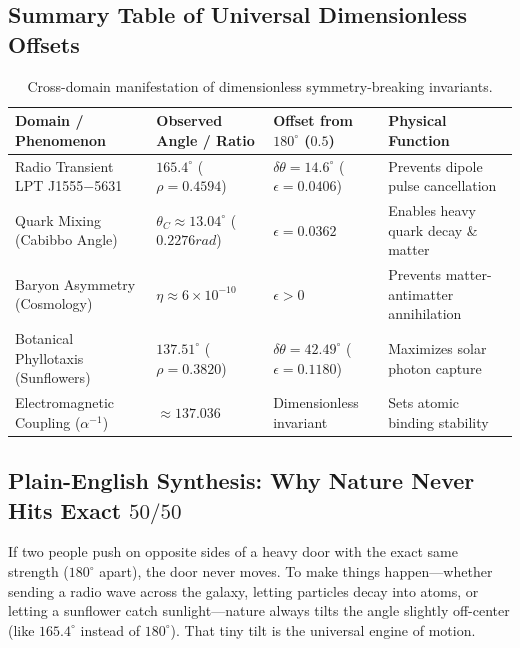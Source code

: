 \documentclass[11pt,a4paper,oneside]{article}
\def\text#1{#1}%
\def\texttt#1{#1}%
\theoremstyle{definition}
\begin{document}
\subsection{Summary Table of Universal Dimensionless Offsets}
\begin{table}[h]
\centering
\small
\begin{tabular}{@{} p{3.8cm} l l p{4.2cm} @{}}
\toprule
\textbf{Domain / Phenomenon} & \textbf{Observed Angle / Ratio} & \textbf{Offset from $180^\circ$ ($0.5$)} & \textbf{Physical Function} \\ \midrule
Radio Transient \texttt{LPT J1555$-$5631} & $165.4^\circ$ ($\rho = 0.4594$) & $\delta \theta = 14.6^\circ$ ($\epsilon = 0.0406$) & Prevents dipole pulse cancellation \\ \addlinespace[4pt]
Quark Mixing (Cabibbo Angle) & $\theta_C \approx 13.04^\circ$ ($0.2276\text{ rad}$) & $\epsilon = 0.0362$ & Enables heavy quark decay \& matter \\ \addlinespace[4pt]
Baryon Asymmetry (Cosmology) & $\eta \approx 6 \times 10^{-10}$ & $\epsilon > 0$ & Prevents matter-antimatter annihilation \\ \addlinespace[4pt]
Botanical Phyllotaxis (Sunflowers) & $137.51^\circ$ ($\rho = 0.3820$) & $\delta \theta = 42.49^\circ$ ($\epsilon = 0.1180$) & Maximizes solar photon capture \\ \addlinespace[4pt]
Electromagnetic Coupling ($\alpha^{-1}$) & $\approx 137.036$ & Dimensionless invariant & Sets atomic binding stability \\ \bottomrule
\end{tabular}
\caption{Cross-domain manifestation of dimensionless symmetry-breaking invariants.}
\end{table}



\subsection{Plain-English Synthesis: Why Nature Never Hits Exact $50/50$}
\begin{noobbox}
If two people push on opposite sides of a heavy door with the exact same strength ($180^\circ$ apart), the door never moves. To make things happen—whether sending a radio wave across the galaxy, letting particles decay into atoms, or letting a sunflower catch sunlight—nature always tilts the angle slightly off-center (like $165.4^\circ$ instead of $180^\circ$). That tiny tilt is the universal engine of motion.
\end{noobbox}
\end{document}
